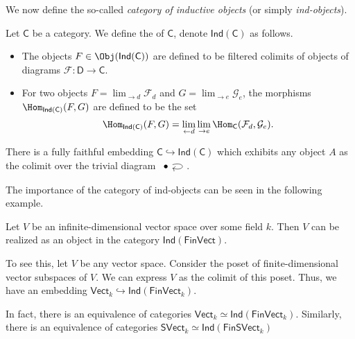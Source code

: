 \documentclass[notes.tex]{subfiles}
\begin{document}
We now define the so-called \emph{category of inductive objects} (or simply \emph{ind-objects}).
\begin{definition}
  \label{def:categoryofindobjects}
  Let $\mathsf{C}$ be a category. We define the  of $\mathsf{C}$, denote $\mathsf{Ind}(\mathsf{C})$ as follows.
  \begin{itemize}
    \item The objects $F \in \Obj(\mathsf{Ind}(\mathsf{C}))$ are defined to be filtered colimits of objects of diagrams $\mathcal{F}\colon \mathsf{D} \rightarrow \mathsf{C}$.

    \item For two objects $F = \lim_{\rightarrow d}\mathcal{F}_{d}$ and $G = \lim_{\rightarrow e}\mathcal{G}_{e}$, the morphisms $\Hom_{\mathsf{Ind}(\mathsf{C})}(F, G)$ are defined to be the set
      \begin{equation*}
        \Hom_{\mathsf{Ind}(\mathsf{C})}(F, G) = \lim_{\leftarrow d} \lim_{\rightarrow e} \Hom_{\mathsf{C}}(\mathcal{F}_{d}, \mathcal{G}_{e}).
      \end{equation*}
  \end{itemize}
\end{definition}

\begin{note}
  \label{note:fullinclusionintoindcategory}
  There is a fully faithful embedding $\mathsf{C} \hookrightarrow\mathsf{Ind}(\mathsf{C})$ which exhibits any object $A$ as the colimit over the trivial diagram $\begin{tikzcd} \bullet \arrow[loop right] \end{tikzcd}$.
\end{note}

The importance of the category of ind-objects can be seen in the following example.
\begin{example}
  \label{eg:inductiveobjectsaddinfinitedimensionalvectorspaces}
  Let $V$ be an infinite-dimensional vector space over some field $k$. Then $V$ can be realized as an object in the category $\mathsf{Ind}(\mathsf{FinVect})$.

  To see this, let $V$ be any vector space. Consider the poset of finite-dimensional vector subspaces of $V$. We can express $V$ as the colimit of this poset. Thus, we have an embedding $\mathsf{Vect}_{k} \hookrightarrow \mathsf{Ind}(\mathsf{FinVect}_{k})$.

  In fact, there is an equivalence of categories $\mathsf{Vect}_{k} \simeq \mathsf{Ind}(\mathsf{FinVect}_{k})$. Similarly, there is an equivalence of categories $\mathsf{SVect}_{k} \simeq \mathsf{Ind}(\mathsf{FinSVect}_{k})$
\end{example}
\end{document}
